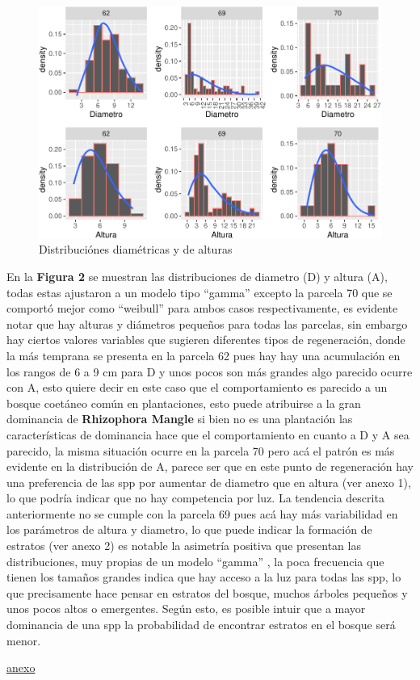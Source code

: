 \documentclass[conference,final,12pt,]{IEEEtran}
\makeatletter
\def\maxwidth{\ifdim\Gin@nat@width>\linewidth\linewidth
\else\Gin@nat@width\fi}
\let\Oldincludegraphics\includegraphics
\renewcommand{\includegraphics}[1]{\Oldincludegraphics[width=\maxwidth]{#1}}
\makeatother
\begin{document}
\begin{figure}
\centering
\includegraphics{mangrove_files/figure-latex/unnamed-chunk-13-1.pdf}
\caption{Distribuciónes diamétricas y de alturas}
\end{figure}

En la \textbf{Figura 2} se muestran las distribuciones de diametro (D) y
altura (A), todas estas ajustaron a un modelo tipo ``gamma'' excepto la
parcela 70 que se comportó mejor como ``weibull'' para ambos casos
respectivamente, es evidente notar que hay alturas y diámetros pequeños
para todas las parcelas, sin embargo hay ciertos valores variables que
sugieren diferentes tipos de regeneración, donde la más temprana se
presenta en la parcela 62 pues hay hay una acumulación en los rangos de
6 a 9 cm para D y unos pocos son más grandes algo parecido ocurre con A,
esto quiere decir en este caso que el comportamiento es parecido a un
bosque coetáneo común en plantaciones, esto puede atribuirse a la gran
dominancia de \textbf{Rhizophora Mangle} si bien no es una plantación
las características de dominancia hace que el comportamiento en cuanto a
D y A sea parecido, la misma situación ocurre en la parcela 70 pero acá
el patrón es más evidente en la distribución de A, parece ser que en
este punto de regeneración hay una preferencia de las spp por aumentar
de diametro que en altura (ver anexo 1), lo que podría indicar que no
hay competencia por luz. La tendencia descrita anteriormente no se
cumple con la parcela 69 pues acá hay más variabilidad en los parámetros
de altura y diametro, lo que puede indicar la formación de estratos (ver
anexo 2) es notable la asimetría positiva que presentan las
distribuciones, muy propias de un modelo ``gamma'' \citep{AJ}, la poca
frecuencia que tienen los tamaños grandes indica que hay acceso a la luz
para todas las spp, lo que precisamente hace pensar en estratos del
bosque, muchos árboles pequeños y unos pocos altos o emergentes. Según
esto, es posible intuir que a mayor dominancia de una spp la
probabilidad de encontrar estratos en el bosque será menor.

\href{http://www.scielo.org.co/pdf/prosp/v12n1/v12n1a12.pdf}{anexo}


\end{document}
